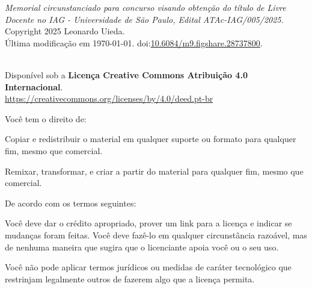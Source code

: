 \documentclass[12pt,a4paper,oneside]{book}
\newcommand{\Year}{2025}
\newcommand{\Author}{Leonardo Uieda}
\newcommand{\TitlePDF}{Memorial circunstanciado para concurso visando obtenção do título de Livre Docente no IAG - Universidade de São Paulo, Edital ATAc-IAG/005/2025}
\newcommand{\MemorialDOI}{10.6084/m9.figshare.28737800}
\begin{document}
{\small

\vspace*{\fill}

\noindent
\textit{\TitlePDF{}}.
\\[0.2cm]
\textcopyright{} Copyright \Year{} \Author{}.
\\[0.2cm]
Última modificação em \today.
doi:\href{https://doi.org/\MemorialDOI}{\MemorialDOI}.

\vspace{2.5cm}

\noindent
\textbf{\LARGE \faCreativeCommons{} \faCreativeCommonsBy{}}
\\
Disponível sob a
\textbf{Licença Creative Commons Atribuição 4.0 Internacional}.
\\
\url{https://creativecommons.org/licenses/by/4.0/deed.pt-br}

\vspace{0.25cm}

\noindent
Você tem o direito de:

\begin{description}[labelindent=0.5cm]
    \item[Compartilhar ---]{
        Copiar e redistribuir o material em qualquer suporte ou formato para
        qualquer fim, mesmo que comercial.
    }
    \item[Adaptar ---]{
        Remixar, transformar, e criar a partir do material para qualquer fim,
        mesmo que comercial.
    }
\end{description}

\vspace{0.25cm}

\noindent
De acordo com os termos seguintes:

\begin{description}[labelindent=0.5cm]
    \item[Atribuição ---]{
         Você deve dar o crédito apropriado, prover um link para a licença
         e indicar se mudanças foram feitas. Você deve fazê-lo em qualquer
         circunstância razoável, mas de nenhuma maneira que sugira que
         o licenciante apoia você ou o seu uso.
    }
    \item[Sem restrições adicionais ---]{
        Você não pode aplicar termos jurídicos ou medidas de caráter
        tecnológico que restrinjam legalmente outros de fazerem algo que
        a licença permita.
}
\end{description}

\vspace{1.5cm}

}
\end{document}
